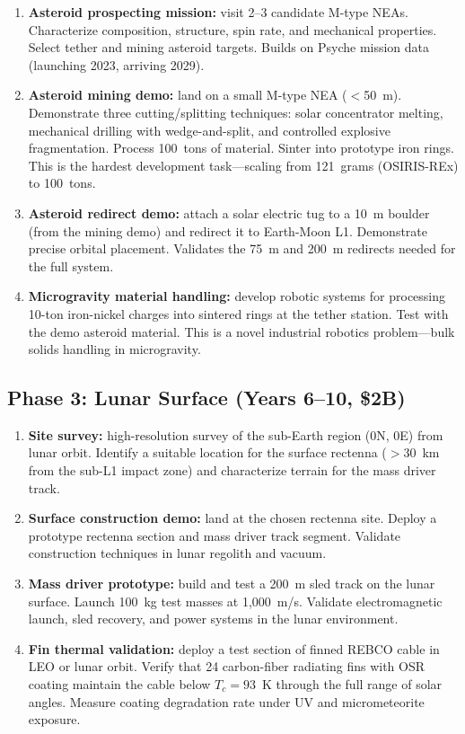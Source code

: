 \documentclass[12pt,letterpaper]{article}
\begin{document}
\begin{enumerate}[label=(\roman*)]
\item \textbf{Asteroid prospecting mission:} visit 2--3 candidate M-type NEAs. Characterize composition, structure, spin rate, and mechanical properties. Select tether and mining asteroid targets. Builds on Psyche mission data (launching 2023, arriving 2029).

\item \textbf{Asteroid mining demo:} land on a small M-type NEA ($<$50~m). Demonstrate three cutting/splitting techniques: solar concentrator melting, mechanical drilling with wedge-and-split, and controlled explosive fragmentation. Process 100~tons of material. Sinter into prototype iron rings. This is the hardest development task---scaling from 121~grams (OSIRIS-REx) to 100~tons.

\item \textbf{Asteroid redirect demo:} attach a solar electric tug to a 10~m boulder (from the mining demo) and redirect it to Earth-Moon L1. Demonstrate precise orbital placement. Validates the 75~m and 200~m redirects needed for the full system.

\item \textbf{Microgravity material handling:} develop robotic systems for processing 10-ton iron-nickel charges into sintered rings at the tether station. Test with the demo asteroid material. This is a novel industrial robotics problem---bulk solids handling in microgravity.
\end{enumerate}

\subsection{Phase 3: Lunar Surface (Years 6--10, \$2B)}

\begin{enumerate}[label=(\roman*)]
\item \textbf{Site survey:} high-resolution survey of the sub-Earth region (0\textdegree N, 0\textdegree E) from lunar orbit. Identify a suitable location for the surface rectenna ($>$30~km from the sub-L1 impact zone) and characterize terrain for the mass driver track.

\item \textbf{Surface construction demo:} land at the chosen rectenna site. Deploy a prototype rectenna section and mass driver track segment. Validate construction techniques in lunar regolith and vacuum.

\item \textbf{Mass driver prototype:} build and test a 200~m sled track on the lunar surface. Launch 100~kg test masses at 1,000~m/s. Validate electromagnetic launch, sled recovery, and power systems in the lunar environment.

\item \textbf{Fin thermal validation:} deploy a test section of finned REBCO cable in LEO or lunar orbit. Verify that 24 carbon-fiber radiating fins with OSR coating maintain the cable below $T_c = 93$~K through the full range of solar angles. Measure coating degradation rate under UV and micrometeorite exposure.
\end{enumerate}
\end{document}
